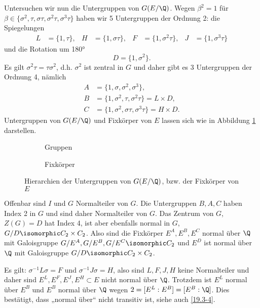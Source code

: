 \begin{ex}
	Untersuchen wir nun die Untergruppen von $G(E / \Q)$.
	Wegen $\beta^2 = 1$ für $\beta \in \{\sigma^2, \tau, \sigma\tau, \sigma^2\tau, \sigma^3\tau\}$ haben wir 5 Untergruppen der Ordnung 2:
	die Spiegelungen
	\begin{align*}
		L &= \{1, \tau\}, &
		H &= \{1, \sigma\tau\}, &
		F &= \{1, \sigma^2\tau\}, &
		J &= \{1, \sigma^3\tau\}
	\end{align*}
	und die Rotation um 180°
	\[
		D = \{1, \sigma^2\}.
	\]
	Es gilt $\sigma^2 \tau = \tau \sigma^2$, d.h. $\sigma^2$ ist zentral in $G$ und daher gibt es 3 Untergruppen der Ordnung 4, nämlich
	\begin{align*}
		A &= \{1, \sigma, \sigma^2, \sigma^3\}, \\
		B &= \{1, \sigma^2, \tau, \sigma^2 \tau\} = L \times D, \\
		C &= \{1, \sigma^2, \sigma\tau, \sigma^3 \tau\} = H \times D.
	\end{align*}
	Untergruppen von $G(E / \Q)$ und Fixkörper von $E$ lassen sich wie in Abbildung \ref{fig:19.5-5} darstellen.

	\begin{figure}[ht]
		\centering
		\begin{subfigure}[b]{0.49\textwidth}
			\resizebox{\linewidth}{!}{}
			\caption{Gruppen}
		\end{subfigure}
		\hfill
		\begin{subfigure}[b]{0.49\textwidth}
			\resizebox{\linewidth}{!}{}
			\caption{Fixkörper}
		\end{subfigure}
		\caption{Hierarchien der Untergruppen von $G(E / \Q)$, bzw. der Fixkörper von $E$}
		 \label{fig:19.5-5}
	\end{figure}

	Offenbar sind $I$ und $G$ Normalteiler von $G$.
	Die Untergruppen $B, A, C$ haben Index 2 in $G$ und sind daher Normalteiler von $G$.
	Das Zentrum von $G$, $Z(G) = D$ hat Index 4, ist aber ebenfalls normal in $G$, $G / D \isomorphic C_2 \times C_2$.
	Also sind die Fixkörper $E^A, E^B, E^C$ normal über $\Q$ mit Galoisgruppe $G / E^A, G / E^B, G / E^C \isomorphic C_2$ und $E^D$ ist normal über $\Q$ mit Galoisgruppe $G / D \isomorphic C_2 \times C_2$.

	Es gilt: $\sigma^{-1} L \sigma = F$ und $\sigma^{-1} J \sigma = H$, also sind $L, F, J, H$ keine Normalteiler und daher sind $E^L, E^F, E^J, E^H \subset E$ nicht normal über $\Q$.
	Trotzdem ist $E^L$ normal über $E^B$ und $E^B$ normal über $\Q$ wegen $2 = [E^L : E^B] = [E^B : \Q]$.
	Dies bestätigt, dass „normal über“ nicht transitiv ist, siehe auch \ref{19.3-4}.
\end{ex}


